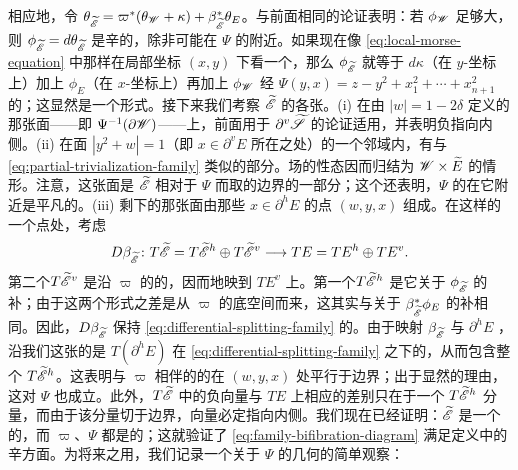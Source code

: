 相应地，令 $\theta_{\widetilde{\mathscr{E}}}=\varpi^*(\theta_{\mathscr{W}}+\kappa)+\beta_{\widetilde{\mathscr{E}}}^*\theta_E$。与前面相同的论证表明：若 $\phi_{\mathscr{W}}$ 足够大，则 $\phi_{\widetilde{\mathscr{E}}}=d\theta_{\widetilde{\mathscr{E}}}$ 是辛的，除非可能在 $\Psi$ 的\trCriticalPoint{}附近。如果现在像 \eqref{eq:local-morse-equation} 中那样在局部坐标 $(x,y)$ 下看一个\trCriticalPoint，那么 $\phi_{\widetilde{\mathscr{E}}}$ 就等于 $d\kappa$（在 $y$-坐标上）加上 $\phi_E$（在 $x$-坐标上）再加上 $\phi_{\mathscr{W}}$ 经 $\Psi(y,x)=z-y^2+x_1^2+\cdots+x_{n+1}^2$ 的\trPullback；这显然是一个\trKaehler{}形式。接下来我们考察 $\widetilde{\mathscr{E}}$ 的各张\trBoundaryFace。(i) 在由 $|w|=1-2\delta$ 定义的那张面——即 $\Psi^{-1}(\partial\mathscr{W})$——上，前面用于 $\partial^v\widetilde{\mathscr{S}}$ 的论证适用，并表明负\trLiouville\trVectorField{}指向内侧。(ii) 在面 $|y^2+w|=1$（即 $x\in\partial^vE$ 所在之处）的一个邻域内，有与 \eqref{eq:partial-trivialization-family} 类似的部分\trTrivialization。\trLiouville{}场的性态因而归结为 $\mathscr{W}\times\widetilde{E}$ 的情形。注意，这张面是 $\widetilde{\mathscr{E}}$ 相对于 $\Psi$ 而取的\trHorizontal{}边界的一部分；这个\trTrivialization{}还表明，$\Psi$ 的\trSymplectic\trConnection{}在它附近是平凡的。(iii) 剩下的那张面由那些 $x\in\partial^hE$ 的点 $(w,y,x)$ 组成。在这样的一个点处，考虑
\begin{equation}\label{eq:differential-splitting-family}
D\beta_{\widetilde{\mathscr{E}}}\colon T\widetilde{\mathscr{E}}=T\widetilde{\mathscr{E}}^h\oplus T\widetilde{\mathscr{E}}^v\longrightarrow TE=TE^h\oplus TE^v.
\end{equation}
第二个\trDirectSummand{}$T\widetilde{\mathscr{E}}^v$ 是沿 $\varpi$ 的\trFiber{}的\trTangentSpace，因而\trIsomorphic{}地映到 $TE^v$ 上。第一个\trDirectSummand{}$T\widetilde{\mathscr{E}}^h$ 是它关于 $\phi_{\widetilde{\mathscr{E}}}$ 的\trOrthogonal{}补；由于这两个形式之差是从 $\varpi$ 的底空间\trPullback{}而来，这其实与关于 $\beta_{\widetilde{\mathscr{E}}}^*\phi_E$ 的\trOrthogonal{}补相同。因此，$D\beta_{\widetilde{\mathscr{E}}}$ 保持 \eqref{eq:differential-splitting-family} 的\trSplitting。由于映射 $\beta_{\widetilde{\mathscr{E}}}$ 与 $\partial^hE$ \trTransverse，沿我们这张\trBoundaryFace{}的\trTangentSpace{}是 $T(\partial^hE)$ 在 \eqref{eq:differential-splitting-family} 之下的\trPreimage，从而包含整个 $T\widetilde{\mathscr{E}}^h$。这表明与 $\varpi$ 相伴的\trSymplectic\trConnection{}的\trHorizontal\trTangentSpace{}在 $(w,y,x)$ 处平行于边界；出于显然的理由，这对 $\Psi$ 也成立。此外，$T\widetilde{\mathscr{E}}$ 中的负\trLiouville{}向量与 $TE$ 上相应\trVectorField{}的差别只在于一个 $T\widetilde{\mathscr{E}}^h$ 分量，而由于该分量切于边界，\trLiouville{}向量必定指向内侧。我们现在已经证明：$\widetilde{\mathscr{E}}$ 是一个\trCorneredBoundary{}的\trExactSymplectic\trManifold，而 $\varpi$、$\Psi$ 都是\trExact{}的\trFibrationWithSingularities；这就验证了 \eqref{eq:family-bifibration-diagram} 满足\trLefschetz\trBifibration{}定义中的辛方面。为将来之用，我们记录一个关于 $\Psi$ 的几何的简单观察：
